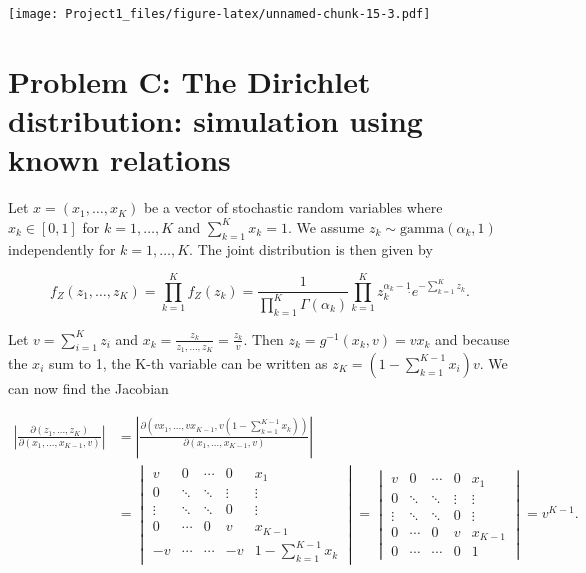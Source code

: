 \documentclass[]{article}
\begin{document}
\texttt{[image: Project1\_files/figure-latex/unnamed-chunk-15-3.pdf]}

\hypertarget{problem-c-the-dirichlet-distribution-simulation-using-known-relations}{%
\section{Problem C: The Dirichlet distribution: simulation using known
relations}\label{problem-c-the-dirichlet-distribution-simulation-using-known-relations}}

Let \(x=(x_1,\dots,x_K)\) be a vector of stochastic random variables
where \(x_k\in[0,1]\) for \(k=1,\dots,K\) and \(\sum_{k=1}^Kx_k=1\). We
assume \(z_k\sim \mathrm{gamma}(\alpha_k,1)\) independently for
\(k=1,\dots,K\). The joint distribution is then given by

\[
f_Z(z_1,\dots,z_K) =
\prod_{k=1}^K f_Z(z_k) = 
\frac{1}{\prod_{k=1}^K\Gamma(\alpha_k)}\dot{} \prod_{k=1}^{K}z_k^{\alpha_k-1} \dot{} e^{-\sum_{k=1}^Kz_k}.
\]

Let \(v=\sum_{i=1}^Kz_i\) and
\(x_k=\frac{z_k}{z_1,\dots,z_K} = \frac{z_k}{v}\). Then
\(z_k = g^{-1}(x_k,v) = vx_k\) and because the \(x_i\) sum to 1, the
K-th variable can be written as \(z_K=(1-\sum_{k=1}^{K-1}x_i)v\). We can
now find the Jacobian

\begin{align*}
\left\lvert \frac{\partial (z_1, \dots,z_K)}{\partial (x_1,\dots,x_{K-1},v)} \right\rvert 
&=\left\lvert \frac{\partial (vx_1, \dots,vx_{K-1}, v(1-\sum_{k=1}^{K-1}x_k))}{\partial (x_1,\dots,x_{K-1},v)} \right\rvert \\

&= 
\begin{vmatrix}
v & 0 & \cdots & 0 & x_1 \\ 
0 & \ddots & \ddots & \vdots & \vdots \\
\vdots & \ddots & \ddots & 0 &\vdots \\
0 & \cdots & 0 & v & x_{K-1} \\
-v & \cdots & \cdots & -v & 1-\sum_{k=1}^{K-1}x_k
\end{vmatrix}
= 
\begin{vmatrix}
v & 0 & \cdots & 0 & x_1 \\ 
0 & \ddots & \ddots & \vdots & \vdots \\
\vdots & \ddots & \ddots & 0 &\vdots \\
0 & \cdots & 0 & v & x_{K-1} \\
0 & \cdots & \cdots & 0 & 1 
\end{vmatrix}
=v^{K-1}.
\end{align*}
\end{document}
